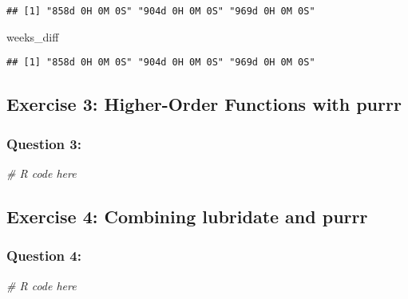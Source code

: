 \documentclass[
]{article}
\newenvironment{Shaded}{\begin{snugshade}}{\end{snugshade}}
\newcommand{\CommentTok}[1]{\textcolor[rgb]{0.56,0.35,0.01}{\textit{#1}}}
\newcommand{\NormalTok}[1]{#1}
\begin{document}
\begin{verbatim}
## [1] "858d 0H 0M 0S" "904d 0H 0M 0S" "969d 0H 0M 0S"
\end{verbatim}

\begin{Shaded}
\begin{Highlighting}[]
\NormalTok{weeks\_diff}
\end{Highlighting}
\end{Shaded}

\begin{verbatim}
## [1] "858d 0H 0M 0S" "904d 0H 0M 0S" "969d 0H 0M 0S"
\end{verbatim}

\subsection{Exercise 3: Higher-Order Functions with
purrr}\label{exercise-3-higher-order-functions-with-purrr}

\subsubsection{Question 3:}\label{question-3}

\begin{Shaded}
\begin{Highlighting}[]
\CommentTok{\# R code here}
\end{Highlighting}
\end{Shaded}

\subsection{Exercise 4: Combining lubridate and
purrr}\label{exercise-4-combining-lubridate-and-purrr}

\subsubsection{Question 4:}\label{question-4}

\begin{Shaded}
\begin{Highlighting}[]
\CommentTok{\# R code here}
\end{Highlighting}
\end{Shaded}
\end{document}
